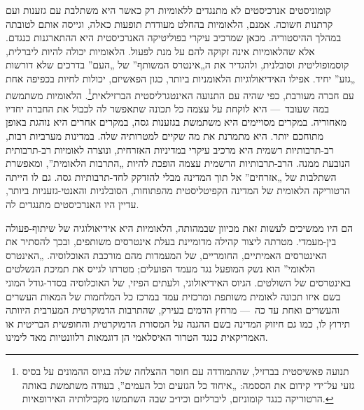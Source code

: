 קומוניסטים אנרכיסטים לא מתנגדים ללאומיות רק כאשר היא משתלבת עם גזענות ועם קרתנות חשוכה. אמנם, הלאומיות בהחלט מעודדת תופעות כאלה, וגייסה אותם לטובתה במהלך ההיסטוריה. מכאן שמרכיב עיקרי בפוליטיקה האנרכיסטית היא ההתארגנות כנגדם. אלא שהלאומיות אינה זקוקה להם על מנת לפעול. הלאומיות יכולה להיות ליברלית, קוסמופוליטית וסובלנית, ולהגדיר את ה„אינטרס המשותף” של „העם” בדרכים שלא דורשות „גזע” יחיד. אפילו האידיאולוגיות הלאומניות ביותר, כגון הפאשיזם, יכולות לחיות בכפיפה אחת עם חברה מעורבת, כפי שהיה עם התנועה האינטגרליסטית הברזילאית\footnote{תנועה פאשיסטית בברזיל, שהתמודדה עם חוסר ההצלחה שלה בגיוס ההמונים על בסיס גזעי על־ידי קידום את הססמה: „איחוד כל הגזעים וכל העמים”, בעודה משתמשת באותה הרטוריקה כנגד קומוניזם, ליברליזם וכיו״ב שבה השתמשו מקבילותיה האירופאיות.}. הלאומיות משתמשת במה שעובד~— היא לוקחת על עצמה כל תכונה שתאפשר לה לכבול את החברה יחדיו מאחוריה. במקרים מסויימים היא משתמשת בגזענות גסה, במקרים אחרים היא נוהגת באופן מתוחכם יותר. היא מתמרנת את מה שקיים למטרותיה שלה. במדינות מערביות רבות, רב-תרבותיות רשמית היא מרכיב עיקרי במדיניות האזרחית, ונוצרה לאומיות רב-תרבותית הנובעת ממנה. הרב-תרבותיות הרשמית עצמה הופכת להיות „התרבות הלאומית”, ומאפשרת השתלבות של „אזרחים” אל תוך המדינה מבלי להזדקק לחד-תרבותיות גסה. גם לו הייתה הרטוריקה הלאומית של המדינה הקפיטליסטית מהפתוחות, הסובלניות והאנטי-גזעניות ביותר, עדיין היו האנרכיסטים מתנגדים לה.

הם היו ממשיכים לעשות זאת מכיוון שבמהותה, הלאומיות היא אידיאולוגיה של שיתוף-פעולה בין-מעמדי. מטרתה ליצור קהילה מדומיינת בעלת אינטרסים משותפים, ובכך להסתיר את האינטרסים האמיתיים, החומריים, של המעמדות מהם מורכבת האוכלוסיה. „האינטרס הלאומי” הוא נשק המופעל נגד מעמד הפועלים; מטרתו לגייס את תמיכת הנשלטים באינטרסים של השולטים. הגיוס האידיאולוגי, ולעתים הפיזי, של האוכלוסיה בסדר-גודל המוני בשם איזו תכונה לאומית משותפת ומרכזית עמד במרכז כל המלחמות של המאות העשרים והעשרים ואחת עד כה~— מרחץ הדמים בעירק,  שהתרבות הדמוקרטית המערבית היוותה תירוץ לו, כמו גם חיזוק המדינה בשם ההגנה על המסורת הדמוקרטית והחופשית הבריטית או האמריקאית כנגד הטרור האיסלאמי הן דוגמאות רלוונטיות מאד לימינו.

